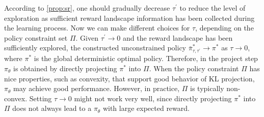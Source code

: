 According to \cref{prop:sr}, one should gradually decrease $\tau^{\prime}$ to reduce the level of exploration as sufficient reward landscape information has been collected during the learning process. Now we can make different choices for $\tau$, depending on the policy constraint set $\Pi$.
Given $\tau^{\prime} \to 0$ and the reward landscape has been sufficiently explored,
the constructed unconstrained policy $\bar{\pi}_{\tau,\tau^{\prime}}^* \to \pi^*$ as $\tau \to 0$, where $\pi^*$ is the global deterministic optimal policy. 
Therefore, in the project step $\pi_\theta$ is obtained by directly projecting $\pi^*$ into $\Pi$. When the policy constraint $\Pi$ has nice properties, such as convexity, that support good behavior of KL projection, $\pi_\theta$ may achieve good performance.
However, in practice, $\Pi$ is typically non-convex. Setting $\tau \to 0$ might not work very well, since directly projecting $\pi^*$ into $\Pi$ does not always lead to a $\pi_\theta$ with large expected reward.

